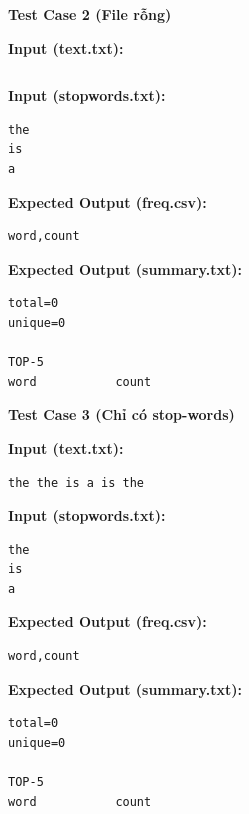 \vspace{0.5cm}

\textbf{Test Case 2 (File rỗng)}

\textbf{Input (text.txt):}

\begin{lstlisting}

\end{lstlisting}

\textbf{Input (stopwords.txt):}

\begin{lstlisting}
the
is
a
\end{lstlisting}

\textbf{Expected Output (freq.csv):}

\begin{lstlisting}
word,count
\end{lstlisting}

\textbf{Expected Output (summary.txt):}

\begin{lstlisting}
total=0
unique=0

TOP-5
word           count
\end{lstlisting}

\vspace{0.5cm}

\textbf{Test Case 3 (Chỉ có stop-words)}

\textbf{Input (text.txt):}

\begin{lstlisting}
the the is a is the
\end{lstlisting}

\textbf{Input (stopwords.txt):}

\begin{lstlisting}
the
is
a
\end{lstlisting}

\textbf{Expected Output (freq.csv):}

\begin{lstlisting}
word,count
\end{lstlisting}

\textbf{Expected Output (summary.txt):}

\begin{lstlisting}
total=0
unique=0

TOP-5
word           count
\end{lstlisting}